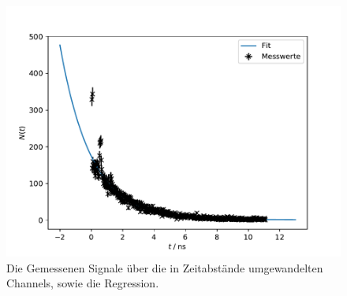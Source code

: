 \begin{figure}[h]
  \centering
  \includegraphics{myonen.pdf}
  \caption{Die Gemessenen Signale über die in Zeitabstände umgewandelten Channels, sowie die Regression.}
  \label{fig:fit}
\end{figure}
